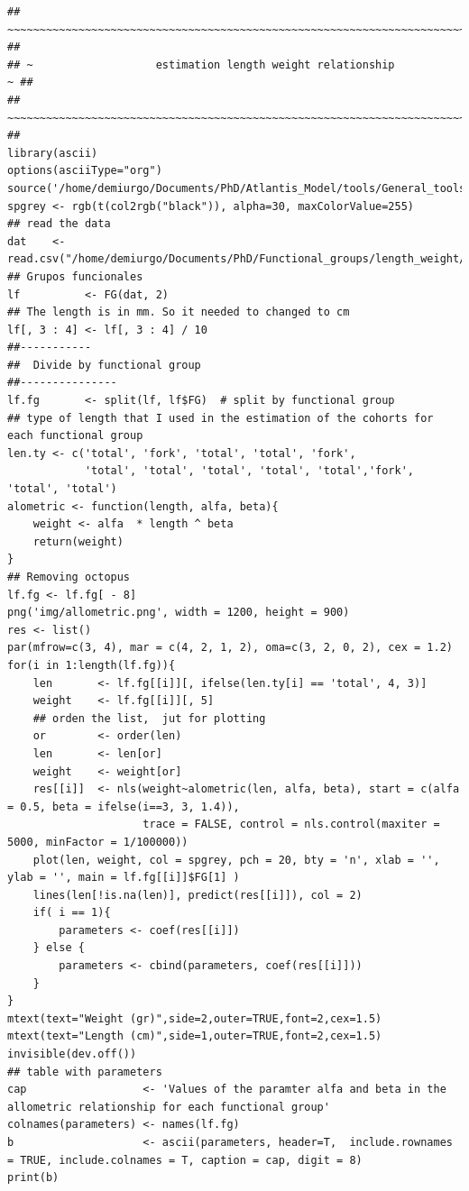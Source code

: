 \documentclass[11pt]{article}
\begin{document}
\begin{itemize}
\begin{itemize}
\begin{verbatim}
## ~~~~~~~~~~~~~~~~~~~~~~~~~~~~~~~~~~~~~~~~~~~~~~~~~~~~~~~~~~~~~~~~~~~~~~~~~~ ##
## ~                   estimation length weight relationship                ~ ##
## ~~~~~~~~~~~~~~~~~~~~~~~~~~~~~~~~~~~~~~~~~~~~~~~~~~~~~~~~~~~~~~~~~~~~~~~~~~ ##
library(ascii)
options(asciiType="org")
source('/home/demiurgo/Documents/PhD/Atlantis_Model/tools/General_tools/Atlantis_tools.R')
spgrey <- rgb(t(col2rgb("black")), alpha=30, maxColorValue=255)
## read the data
dat    <- read.csv("/home/demiurgo/Documents/PhD/Functional_groups/length_weight/length_weight_jf.csv")
## Grupos funcionales
lf          <- FG(dat, 2)
## The length is in mm. So it needed to changed to cm
lf[, 3 : 4] <- lf[, 3 : 4] / 10
##-----------
##  Divide by functional group
##---------------
lf.fg       <- split(lf, lf$FG)  # split by functional group
## type of length that I used in the estimation of the cohorts for each functional group
len.ty <- c('total', 'fork', 'total', 'total', 'fork',
            'total', 'total', 'total', 'total', 'total','fork', 'total', 'total')
alometric <- function(length, alfa, beta){
    weight <- alfa  * length ^ beta
    return(weight)
}
## Removing octopus
lf.fg <- lf.fg[ - 8]
png('img/allometric.png', width = 1200, height = 900)
res <- list()
par(mfrow=c(3, 4), mar = c(4, 2, 1, 2), oma=c(3, 2, 0, 2), cex = 1.2)
for(i in 1:length(lf.fg)){
    len       <- lf.fg[[i]][, ifelse(len.ty[i] == 'total', 4, 3)]
    weight    <- lf.fg[[i]][, 5]
    ## orden the list,  jut for plotting
    or        <- order(len)
    len       <- len[or]
    weight    <- weight[or]
    res[[i]]  <- nls(weight~alometric(len, alfa, beta), start = c(alfa = 0.5, beta = ifelse(i==3, 3, 1.4)),
                     trace = FALSE, control = nls.control(maxiter = 5000, minFactor = 1/100000))
    plot(len, weight, col = spgrey, pch = 20, bty = 'n', xlab = '', ylab = '', main = lf.fg[[i]]$FG[1] )
    lines(len[!is.na(len)], predict(res[[i]]), col = 2)
    if( i == 1){
        parameters <- coef(res[[i]])
    } else {
        parameters <- cbind(parameters, coef(res[[i]]))
    }
}
mtext(text="Weight (gr)",side=2,outer=TRUE,font=2,cex=1.5)
mtext(text="Length (cm)",side=1,outer=TRUE,font=2,cex=1.5)
invisible(dev.off())
## table with parameters
cap                  <- 'Values of the paramter alfa and beta in the allometric relationship for each functional group'
colnames(parameters) <- names(lf.fg)
b                    <- ascii(parameters, header=T,  include.rownames = TRUE, include.colnames = T, caption = cap, digit = 8)
print(b)
\end{verbatim}


\end{itemize}
\end{itemize}
\end{document}
